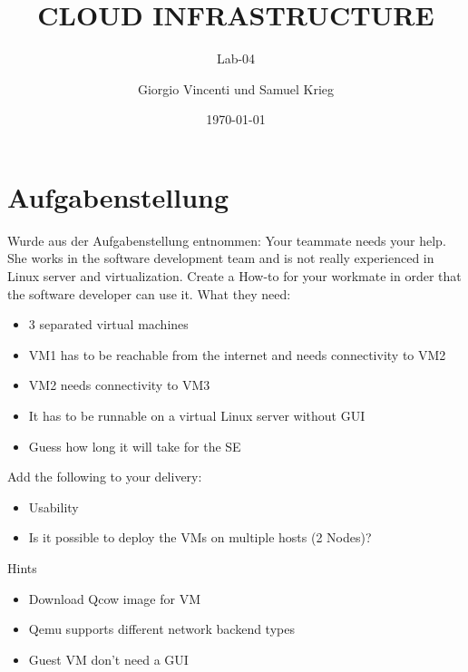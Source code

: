 \documentclass[a4,12pt]{scrartcl}
\title{CLOUD INFRASTRUCTURE}
\subtitle{Lab-04}
\author{Giorgio Vincenti und Samuel Krieg}
\date{\today}
\begin{document}
\clearpage\maketitle
\thispagestyle{empty}
\tableofcontents

\section{Aufgabenstellung}
Wurde aus der Aufgabenstellung entnommen: \newline
\newline
Your teammate needs your help. She works in the software development team and is not really experienced in Linux server and virtualization. Create a How-to for your workmate in order that the software developer can use it.
\newline
\newline
What they need:
\begin{itemize}
\item 3 separated virtual machines
\item  VM1 has to be reachable from the internet and needs connectivity to VM2
\item VM2 needs connectivity to VM3
\item It has to be runnable on a virtual Linux server without GUI
\item Guess how long it will take for the SE
\end{itemize}

Add the following to your delivery:
\begin{itemize}
\item Usability
\item Is it possible to deploy the VMs on multiple hosts (2 Nodes)?
\end{itemize}

Hints
\begin{itemize}
\item Download Qcow image for VM
\item Qemu supports different network backend types
\item Guest VM don’t need a GUI
\end{itemize}
\end{document}
